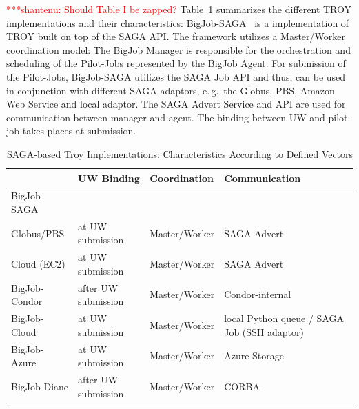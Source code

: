 \documentclass[conference,final]{IEEEtran}
\newcommand{\jhanote}[1]{ {\textcolor{red} { ***shantenu: #1 }}}
\newcommand{\jhanote}[1]{}
\begin{document}
\jhanote{Should Table I be zapped?} Table~\ref{tab:pilotjob_overview}
summarizes the different TROY implementations and their
characteristics: BigJob-SAGA~\cite{saga_bigjob_condor_cloud} is a
implementation of TROY built on top of the SAGA API. The framework
utilizes a Master/Worker coordination model: The BigJob Manager is
responsible for the orchestration and scheduling of the Pilot-Jobs
represented by the BigJob Agent.  For submission of the Pilot-Jobs,
BigJob-SAGA utilizes the SAGA Job API and thus, can be used in
conjunction with different SAGA adaptors, e.\,g.\ the Globus, PBS,
Amazon Web Service and local adaptor. The SAGA Advert Service and API
are used for communication between manager and agent. The binding
between UW and pilot-job takes places at submission.



\begin{table}[t]
\centering
\begin{tabular}{|p{1.8cm}|p{1.7cm}|p{1.7cm}|p{1.7cm}|}
	\hline
	&\textbf{UW Binding} &\textbf{Coordina\-tion} & \textbf{Communica\-tion} \\
	\hline
	BigJob-SAGA &&&\\
	\hline
	\hspace{2mm} Globus/PBS   &at UW submission
									  &Master/Worker &SAGA Advert \\  
	\hline
	\hspace{2mm} Cloud (EC2)  &at UW submission 
									  &Master/Worker &SAGA Advert \\ 
    \hline
   BigJob-Condor &after UW submission &Master/Worker &Condor-internal \\
	\hline
 	BigJob-Cloud &at UW submission   &Master/Worker 
				 &local Python queue / SAGA Job (SSH adaptor) \\ 
	\hline
	BigJob-Azure &at UW submission
	             &Master/Worker &Azure Storage \\ 
	\hline
    BigJob-Diane &after UW submission  &Master/Worker &CORBA  \\ 
	\hline	
\end{tabular}
\caption{SAGA-based Troy Implementations: Characteristics According to
  Defined Vectors} \label{tab:pilotjob_overview}
\end{table}		
\end{document}
